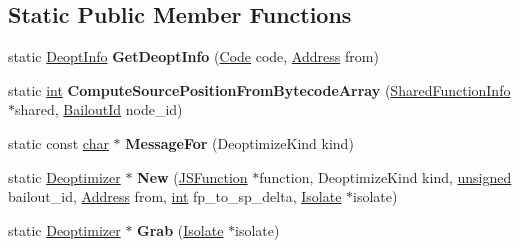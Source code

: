\subsection*{Static Public Member Functions}
\begin{DoxyCompactItemize}
\item 
\mbox{\label{classv8_1_1internal_1_1Deoptimizer_af09f0f35ba838e625b61f8a3f65843a8}} 
static \mbox{\hyperlink{structv8_1_1internal_1_1Deoptimizer_1_1DeoptInfo}{Deopt\+Info}} {\bfseries Get\+Deopt\+Info} (\mbox{\hyperlink{classv8_1_1internal_1_1Code}{Code}} code, \mbox{\hyperlink{classuintptr__t}{Address}} from)
\item 
\mbox{\label{classv8_1_1internal_1_1Deoptimizer_a0063f5e56ac9f2099c7ca5c6db1dd361}} 
static \mbox{\hyperlink{classint}{int}} {\bfseries Compute\+Source\+Position\+From\+Bytecode\+Array} (\mbox{\hyperlink{classv8_1_1internal_1_1SharedFunctionInfo}{Shared\+Function\+Info}} $\ast$shared, \mbox{\hyperlink{classv8_1_1internal_1_1BailoutId}{Bailout\+Id}} node\+\_\+id)
\item 
\mbox{\label{classv8_1_1internal_1_1Deoptimizer_af51f56df0988bd350f6b4bc378c45ff0}} 
static const \mbox{\hyperlink{classchar}{char}} $\ast$ {\bfseries Message\+For} (Deoptimize\+Kind kind)
\item 
\mbox{\label{classv8_1_1internal_1_1Deoptimizer_a95cb1c4fe5c140ec11582a0733258b58}} 
static \mbox{\hyperlink{classv8_1_1internal_1_1Deoptimizer}{Deoptimizer}} $\ast$ {\bfseries New} (\mbox{\hyperlink{classv8_1_1internal_1_1JSFunction}{J\+S\+Function}} $\ast$function, Deoptimize\+Kind kind, \mbox{\hyperlink{classunsigned}{unsigned}} bailout\+\_\+id, \mbox{\hyperlink{classuintptr__t}{Address}} from, \mbox{\hyperlink{classint}{int}} fp\+\_\+to\+\_\+sp\+\_\+delta, \mbox{\hyperlink{classv8_1_1internal_1_1Isolate}{Isolate}} $\ast$isolate)
\item 
\mbox{\label{classv8_1_1internal_1_1Deoptimizer_a078aeb9b54269abe7f5f922c2ca540e8}} 
static \mbox{\hyperlink{classv8_1_1internal_1_1Deoptimizer}{Deoptimizer}} $\ast$ {\bfseries Grab} (\mbox{\hyperlink{classv8_1_1internal_1_1Isolate}{Isolate}} $\ast$isolate)
\item 

\end{DoxyCompactItemize}
